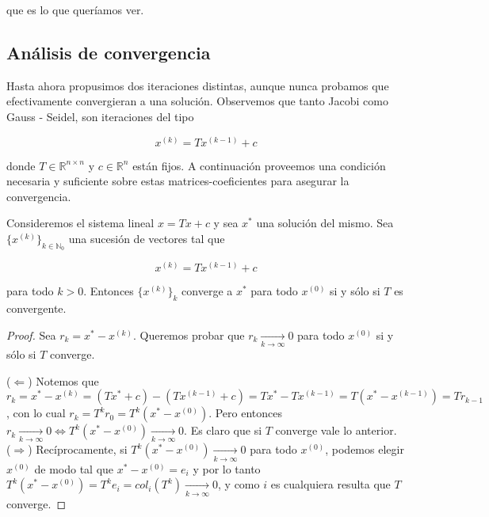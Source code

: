 que es lo que queríamos ver.


\subsection{Análisis de convergencia}

Hasta ahora propusimos dos iteraciones distintas, aunque nunca probamos que efectivamente convergieran a una solución. Observemos que tanto Jacobi como Gauss - Seidel, son iteraciones del tipo

\[x^{(k)} = Tx^{(k - 1)} + c\]

donde $T \in \mathbb{R}^{n \times n}$ y $c \in \mathbb{R}^{n}$ están fijos. A continuación proveemos una condición necesaria y suficiente sobre estas matrices-coeficientes para asegurar la convergencia.

\begin{propo}
Consideremos el sistema lineal $x = Tx + c$ y sea $x^*$ una solución del mismo. Sea $\{x^{(k)}\}_{k \in \mathbb{N}_0}$ una sucesión de vectores tal que

\[x^{(k)} = Tx^{(k - 1)} + c\]

para todo $k > 0$. Entonces $\{x^{(k)}\}_k$ converge a $x^*$ para todo $x^{(0)}$ si y sólo si $T$ es convergente.

\begin{proof}
Sea $r_k = x^* - x^{(k)}$. Queremos probar que $r_k \xrightarrow[k \to \infty]{} 0$ para todo $x^{(0)}$ si y sólo si $T$ converge.

($\Leftarrow$) Notemos que $r_k = x^* - x^{(k)} = (Tx^* + c) - (Tx^{(k - 1)} + c) = Tx^* - Tx^{(k - 1)} = T(x^* - x^{(k - 1)}) = Tr_{k - 1}$, con lo cual $r_k = T^{k}r_0 = T^k(x^* - x^{(0)})$. Pero entonces $r_k \xrightarrow[k \to \infty]{} 0 \Leftrightarrow T^k(x^* - x^{(0)}) \xrightarrow[k \to \infty]{} 0$. Es claro que si $T$ converge vale lo anterior.\\[0.25cm]

($\Rightarrow$) Recíprocamente, si $T^k(x^* - x^{(0)}) \xrightarrow[k \to \infty]{} 0$ para todo $x^{(0)}$, podemos elegir $x^{(0)}$ de modo tal que $x^* - x^{(0)} = e_i$ y por lo tanto $T^k(x^* - x^{(0)}) = T^ke_i = col_i(T^k) \xrightarrow[k \to \infty]{} 0$, y como $i$ es cualquiera resulta que $T$ converge.
\end{proof}
\end{propo}

